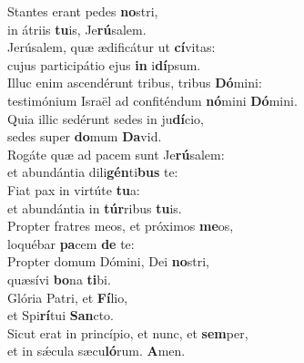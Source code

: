 \evenverse Stantes erant pedes \textbf{no}stri,~\*\\
\evenverse in átriis \textbf{tu}is, Je\textbf{rú}salem.\\
\oddverse Jerúsalem, quæ ædificátur ut \textbf{cí}vitas:~\*\\
\oddverse cujus participátio ejus \textbf{in} i\textbf{dí}psum.\\
\evenverse Illuc enim ascendérunt tribus, tribus \textbf{Dó}mini:~\*\\
\evenverse testimónium Israël ad confiténdum \textbf{nó}mini \textbf{Dó}mini.\\
\oddverse Quia illic sedérunt sedes in ju\textbf{dí}cio,~\*\\
\oddverse sedes super \textbf{do}mum \textbf{Da}vid.\\
\evenverse Rogáte quæ ad pacem sunt Je\textbf{rú}salem:~\*\\
\evenverse et abundántia dili\textbf{gén}ti\textbf{bus} te:\\
\oddverse Fiat pax in virtúte \textbf{tu}a:~\*\\
\oddverse et abundántia in \textbf{túr}ribus \textbf{tu}is.\\
\evenverse Propter fratres meos, et próximos \textbf{me}os,~\*\\
\evenverse loquébar \textbf{pa}cem \textbf{de} te:\\
\oddverse Propter domum Dómini, Dei \textbf{no}stri,~\*\\
\oddverse quæsívi \textbf{bo}na \textbf{ti}bi.\\
\evenverse Glória Patri, et \textbf{Fí}lio,~\*\\
\evenverse et Spi\textbf{rí}tui \textbf{San}cto.\\
\oddverse Sicut erat in princípio, et nunc, et \textbf{sem}per,~\*\\
\oddverse et in sǽcula sæcu\textbf{ló}rum. \textbf{A}men.\\
